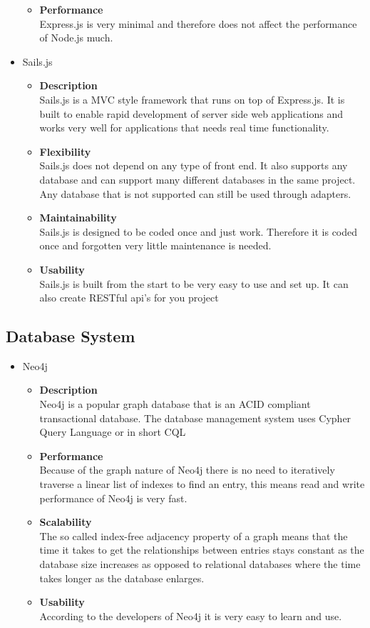\documentclass[11pt,fleqn]{book} %
\begin{document}
\begin{itemize}
\begin{itemize}
			\item \textbf{Performance}\\
			Express.js is very minimal and therefore does not affect the performance of Node.js much.
		\end{itemize}
		\item Sails.js
		\begin{itemize}
			\item \textbf{Description}\\
			Sails.js is a MVC style framework that runs on top of Express.js. It is built to enable rapid development of server side web applications and works very well for applications that needs real time functionality.
			\item \textbf{Flexibility}\\
			Sails.js does not depend on any type of front end. It also supports any database and can support many different databases in the same project. Any database that is not supported can still be used through adapters.
			\item \textbf{Maintainability}\\
			Sails.js is designed to be coded once and just work. Therefore it is coded once and forgotten very little maintenance is needed.
			\item \textbf{Usability}\\
			Sails.js is built from the start to be very easy to use and set up. It can also create RESTful api’s for you project
		\end{itemize}
	\end{itemize}
	\subsection{Database System}
	\begin{itemize}
		\item Neo4j
		\begin{itemize}
			\item \textbf{Description}\\
			Neo4j is a popular graph database that is an ACID compliant transactional database. The database management system uses Cypher Query Language or in short CQL
			\item \textbf{Performance}\\
			Because of the graph nature of  Neo4j there is no need to iteratively traverse a linear list of indexes to find an entry, this means read and write performance of Neo4j is very fast.
			\item \textbf{Scalability}\\
			The so called index-free adjacency property of a graph means that the time it takes to get the relationships between entries stays constant as the database size increases as opposed to relational databases where the time takes longer as the database enlarges.
			\item \textbf{Usability}\\
			According to the developers of Neo4j it is very easy to learn and use.
		\end{itemize}
	\end{itemize}
\end{document}
